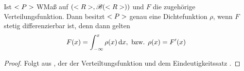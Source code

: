 \begin{conclusion}
	Ist $<P>$ WMaß auf $(<R>, \mathscr{B}(<R>))$ und $F$ die zugehörige Verteilungsfunktion. Dann besitzt $<P>$ genau eine Dichtefunktion $\rho$, wenn $F$ stetig differenzierbar ist, denn dann gelten
	\begin{align}
		F(x) = \int_{-\infty}^{x} \rho(x) \,\mathrm{d} x, \text{ bzw. } \rho(x) = F'(x)\notag
	\end{align}
\end{conclusion}

\begin{proof}
	Folgt aus , der  der Verteiltungsfunktion und dem Eindeutigkeitssatz .
\end{proof}